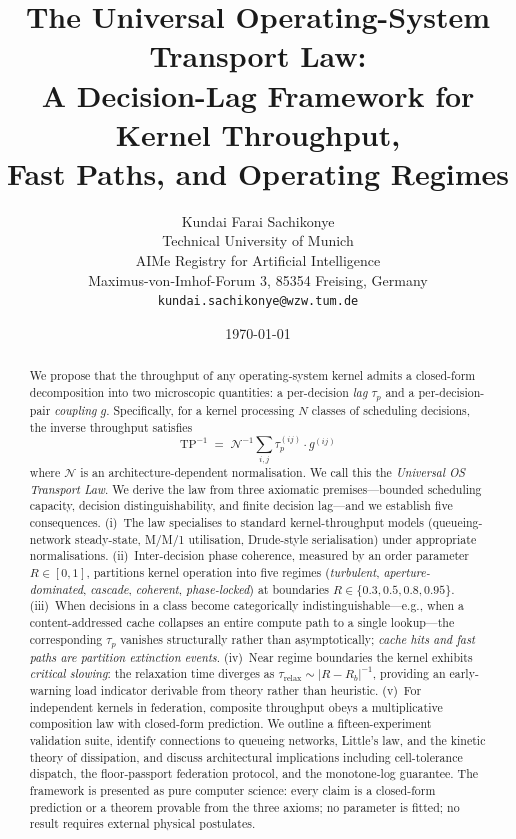 \documentclass[twocolumn,11pt,a4paper]{article}
\title{\textbf{The Universal Operating-System Transport Law:\\[3pt]
A Decision-Lag Framework for Kernel Throughput,\\[2pt]
Fast Paths, and Operating Regimes}}
\author{Kundai Farai Sachikonye\\
Technical University of Munich\\
AIMe Registry for Artificial Intelligence\\
Maximus-von-Imhof-Forum 3, 85354 Freising, Germany\\
\texttt{kundai.sachikonye@wzw.tum.de}}
\date{\today}
\newcommand{\TP}{\mathrm{TP}}
\newcommand{\taup}{\tau_p}
\newcommand{\Norm}{\mathcal{N}}
\newcommand{\Rens}{R}
\begin{document}
\maketitle

\begin{abstract}
We propose that the throughput of any operating-system kernel admits a closed-form decomposition into two microscopic quantities: a per-decision \emph{lag} $\taup$ and a per-decision-pair \emph{coupling} $g$. Specifically, for a kernel processing $N$ classes of scheduling decisions, the inverse throughput satisfies
\[
\TP^{-1} \;=\; \Norm^{-1}\sum_{i,j} \taup^{(ij)} \cdot g^{(ij)}
\]
where $\Norm$ is an architecture-dependent normalisation. We call this the \emph{Universal OS Transport Law}. We derive the law from three axiomatic premises---bounded scheduling capacity, decision distinguishability, and finite decision lag---and we establish five consequences. (i)~The law specialises to standard kernel-throughput models (queueing-network steady-state, M/M/1 utilisation, Drude-style serialisation) under appropriate normalisations. (ii)~Inter-decision phase coherence, measured by an order parameter $\Rens \in [0,1]$, partitions kernel operation into five regimes (\emph{turbulent}, \emph{aperture-dominated}, \emph{cascade}, \emph{coherent}, \emph{phase-locked}) at boundaries $\Rens \in \{0.3, 0.5, 0.8, 0.95\}$. (iii)~When decisions in a class become categorically indistinguishable---e.g., when a content-addressed cache collapses an entire compute path to a single lookup---the corresponding $\taup$ vanishes structurally rather than asymptotically; \emph{cache hits and fast paths are partition extinction events}. (iv)~Near regime boundaries the kernel exhibits \emph{critical slowing}: the relaxation time diverges as $\tau_\mathrm{relax} \sim |\Rens - \Rens_b|^{-1}$, providing an early-warning load indicator derivable from theory rather than heuristic. (v)~For independent kernels in federation, composite throughput obeys a multiplicative composition law with closed-form prediction. We outline a fifteen-experiment validation suite, identify connections to queueing networks, Little's law, and the kinetic theory of dissipation, and discuss architectural implications including cell-tolerance dispatch, the floor-passport federation protocol, and the monotone-log guarantee. The framework is presented as pure computer science: every claim is a closed-form prediction or a theorem provable from the three axioms; no parameter is fitted; no result requires external physical postulates.
\end{abstract}
\end{document}
